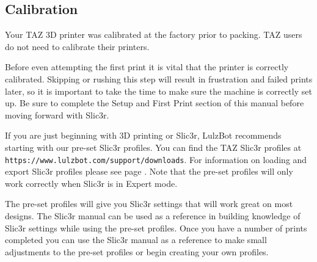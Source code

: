 
\subsection{Calibration}
\label{calibration}

Your TAZ 3D printer was calibrated at the factory prior to packing. TAZ users do not need to calibrate their printers. 

Before even attempting the first print it is vital that the printer is correctly calibrated. Skipping or rushing this step will result in frustration and failed prints later, so it is important to take the time to make sure the machine is correctly set up. Be sure to complete the Setup and First Print section of this manual before moving forward with Slic3r.

If you are just beginning with 3D printing or Slic3r, LulzBot recommends starting with our pre-set Slic3r profiles. You can find the TAZ Slic3r profiles at \texttt{https://www.lulzbot.com/support/downloads}. For information on loading and export Slic3r profiles please see page \pageref{sub:exporting_and_importing_configuration}. Note that the pre-set profiles will only work correctly when Slic3r is in Expert mode.

The pre-set profiles will give you Slic3r settings that will work great on most designs. The Slic3r manual can be used as a reference in building knowledge of Slic3r settings while using the pre-set profiles. Once you have a number of prints completed you can use the Slic3r manual as a reference to make small adjustments to the pre-set profiles or begin creating your own profiles.
